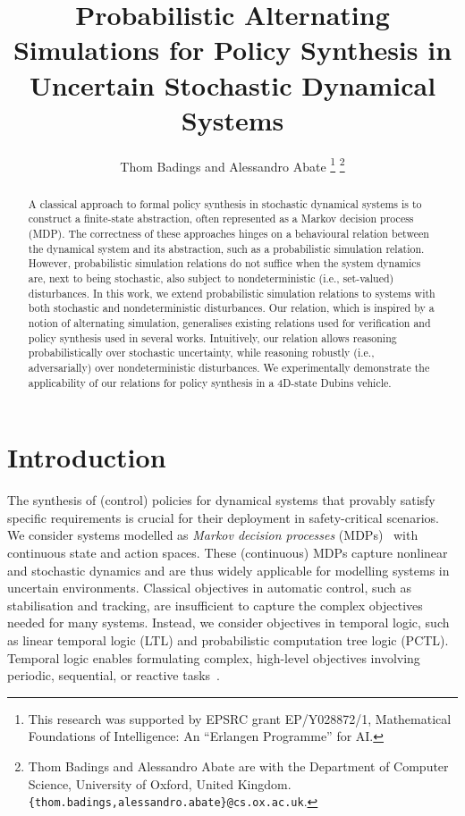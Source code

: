 \documentclass[letterpaper, 10 pt, conference]{ieeeconf}  %
\title{\LARGE \bf
Probabilistic Alternating Simulations for Policy Synthesis in \\ Uncertain Stochastic Dynamical Systems
}
\author{Thom Badings and Alessandro Abate%
\thanks{This research was supported by EPSRC grant EP/Y028872/1, Mathematical Foundations of Intelligence: An ``Erlangen Programme'' for AI.}%
\thanks{Thom Badings and Alessandro Abate are with the Department of
Computer Science, University of Oxford, United Kingdom. {\tt\small \{thom.badings,alessandro.abate\}@cs.ox.ac.uk}.}%
}
\begin{document}
\maketitle
\thispagestyle{empty}
\pagestyle{empty}


\begin{abstract}
A classical approach to formal policy synthesis in stochastic dynamical systems is to construct a finite-state abstraction, often represented as a Markov decision process (MDP). The correctness of these approaches hinges on a behavioural relation between the dynamical system and its abstraction, such as a probabilistic simulation relation. However, probabilistic simulation relations do not suffice when the system dynamics are, next to being stochastic, also subject to nondeterministic (i.e., set-valued) disturbances. In this work, we extend probabilistic simulation relations to systems with both stochastic and nondeterministic disturbances. Our relation, which is inspired by a notion of alternating simulation, generalises existing relations used for verification and policy synthesis used in several works. Intuitively, our relation allows reasoning probabilistically over stochastic uncertainty, while reasoning robustly (i.e., adversarially) over nondeterministic disturbances. We experimentally demonstrate the applicability of our relations for policy synthesis in a 4D-state Dubins vehicle.
\end{abstract}



\section{Introduction}
The synthesis of (control) policies for dynamical systems that provably satisfy specific requirements is crucial for their deployment in safety-critical scenarios. 
We consider systems modelled as \emph{Markov decision processes} (MDPs)~\cite{DBLP:books/wi/Puterman94} with continuous state and action spaces.
These (continuous) MDPs capture nonlinear and stochastic dynamics and are thus widely applicable for modelling systems in uncertain environments.
Classical objectives in automatic control, such as stabilisation and tracking, are insufficient to capture the complex objectives needed for many systems.
Instead, we consider objectives in temporal logic, such as linear temporal logic (LTL) %
and probabilistic computation tree logic (PCTL). %
Temporal logic enables formulating complex, high-level objectives involving periodic, sequential, or reactive tasks~\cite{BaierKatoen08}.
\end{document}
